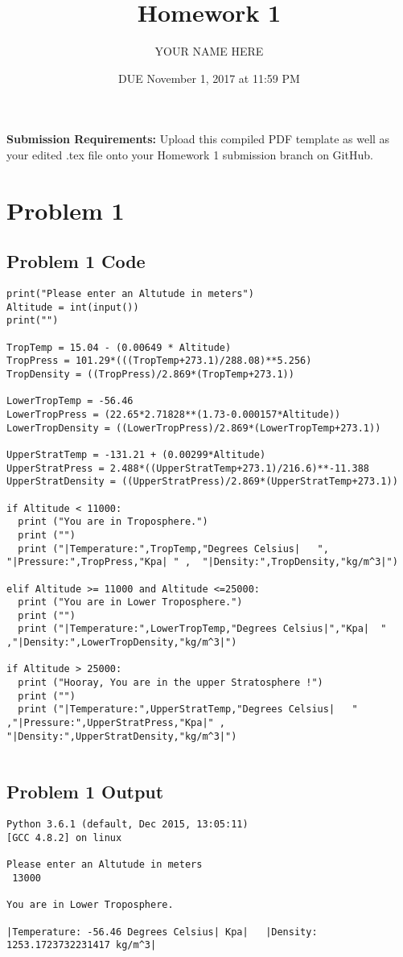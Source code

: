 \documentclass{article}
\title{Homework 1}
\author{YOUR NAME HERE}
\date{DUE November 1, 2017 at 11:59 PM}
\begin{document}
\maketitle

\bigskip
\bigskip
\bigskip
\bigskip
\bigskip
\bigskip
\textbf{Submission Requirements:} Upload this compiled PDF template as well as your edited .tex file onto your Homework 1 submission branch on GitHub.
\newpage
\section{Problem 1}


\subsection{Problem 1 Code}
\begin{verbatim}
print("Please enter an Altutude in meters")
Altitude = int(input())
print("")

TropTemp = 15.04 - (0.00649 * Altitude)
TropPress = 101.29*(((TropTemp+273.1)/288.08)**5.256)
TropDensity = ((TropPress)/2.869*(TropTemp+273.1))

LowerTropTemp = -56.46
LowerTropPress = (22.65*2.71828**(1.73-0.000157*Altitude))
LowerTropDensity = ((LowerTropPress)/2.869*(LowerTropTemp+273.1))

UpperStratTemp = -131.21 + (0.00299*Altitude)
UpperStratPress = 2.488*((UpperStratTemp+273.1)/216.6)**-11.388
UpperStratDensity = ((UpperStratPress)/2.869*(UpperStratTemp+273.1))

if Altitude < 11000:
  print ("You are in Troposphere.")
  print ("")
  print ("|Temperature:",TropTemp,"Degrees Celsius|   ", "|Pressure:",TropPress,"Kpa| " ,  "|Density:",TropDensity,"kg/m^3|")
  
elif Altitude >= 11000 and Altitude <=25000:
  print ("You are in Lower Troposphere.")
  print ("")
  print ("|Temperature:",LowerTropTemp,"Degrees Celsius|","Kpa|  " ,"|Density:",LowerTropDensity,"kg/m^3|")
    
if Altitude > 25000:
  print ("Hooray, You are in the upper Stratosphere !")
  print ("")
  print ("|Temperature:",UpperStratTemp,"Degrees Celsius|   " ,"|Pressure:",UpperStratPress,"Kpa|" , "|Density:",UpperStratDensity,"kg/m^3|")
  
\end{verbatim}


\subsection{Problem 1 Output}
\begin{verbatim}
Python 3.6.1 (default, Dec 2015, 13:05:11)
[GCC 4.8.2] on linux
   
Please enter an Altutude in meters
 13000

You are in Lower Troposphere.

|Temperature: -56.46 Degrees Celsius| Kpa|   |Density: 1253.1723732231417 kg/m^3|
\end{verbatim} 
\end{document}

